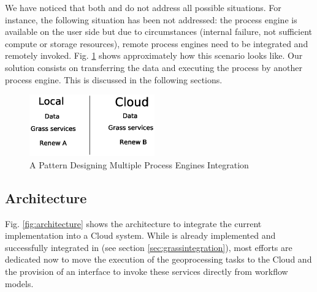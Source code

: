 
We have noticed that both \cite{han10} and \cite{leyman09} do not address all possible situations.
%
For instance, the following situation has been not addressed: the process engine is available on the user side but due to circumstances (internal failure, not sufficient compute or storage resources), remote process engines need to be integrated and remotely invoked.
%
Fig. \ref{fig:pattern5} shows approximately how this scenario looks like.
%
Our solution consists on transferring the data and executing the process by another process engine.
%
This is discussed in the following sections. 
%
% 
%
%
\begin{figure}[!t]
    \centering
  \includegraphics[width=0.48\textwidth,height=0.10\textheight]{images/pattern5}
\caption{A Pattern Designing Multiple Process Engines Integration}
\label{fig:pattern5}
\end{figure}

\subsection{Architecture}
%
Fig. \ref{fig:architecture} shows the architecture to integrate the current implementation into a Cloud system.
%
While \RenewGrass{} is already implemented and successfully integrated in \Renew{} (see section \ref{sec:grassintegration}), most efforts are dedicated now to move the execution of the geoprocessing tasks to the Cloud and the provision of an interface to invoke these services  directly from workflow models.

